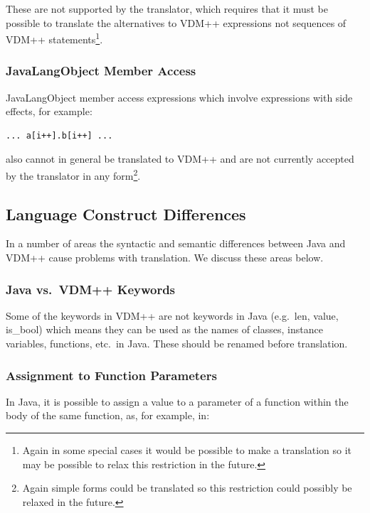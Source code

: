 \documentclass[\pformat,12pt]{article}
\begin{document}
These are not supported by the translator, which requires that it must
be possible to translate the alternatives to VDM++ expressions not
sequences of VDM++ statements\footnote{Again in some special cases it
  would be possible to make a translation so it may be possible to
  relax this restriction in the future.}.

\subsubsection{JavaLangObject Member Access}

JavaLangObject member access expressions which involve expressions with side
effects, for example:

\begin{small}
\begin{verbatim}
... a[i++].b[i++] ...
\end{verbatim}
\end{small}

also cannot in general be translated to VDM++ and are not currently
accepted by the translator in any form\footnote{Again simple forms
  could be translated so this restriction could possibly be relaxed in
  the future.}.

\subsection{Language Construct Differences}

In a number of areas the syntactic and semantic differences
between Java and VDM++ cause problems with translation. We discuss
these areas below.

\subsubsection{Java vs.\ VDM++ Keywords}

Some of the keywords in VDM++ are not keywords in Java (e.g.\ len,
value, is\_bool) which means they can be used as the names of classes,
instance variables, functions, etc.\ in Java. These should be renamed
before translation.

\subsubsection{Assignment to Function Parameters}

In Java, it is possible to assign a value to a parameter of a function
within the body of the same function, as, for example, in:
\end{document}
